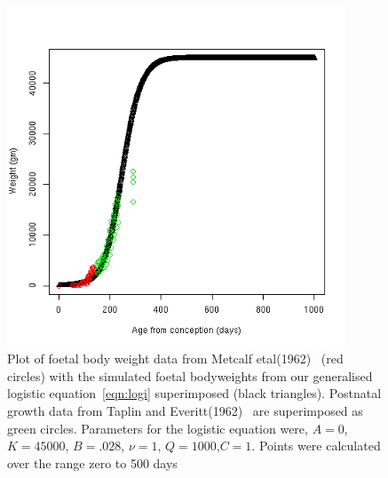 %

\begin{figure}[!h]
  \centering
   \includegraphics[width=0.9\textwidth]{lwagefit3.png}
  \caption{Plot of foetal body weight data from Metcalf etal(1962)~\cite{metc:62} (red circles) with the simulated foetal bodyweights from our generalised logistic equation~\ref{eqn:logi} superimposed (black triangles). Postnatal growth data from Taplin and Everitt(1962)~\cite{tapl:62} are superimposed as green circles.  Parameters for the logistic equation were, $A=0$, $K=45000$, $B=.028$, $\nu=1$, $Q=1000$,$C=1$. Points were calculated over the range zero to 500 days}
  \label{fig:mlbwagefit3}
\end{figure}

%


